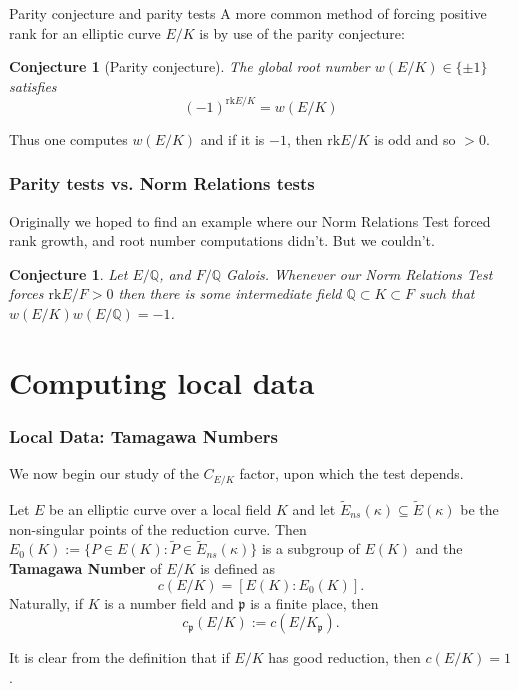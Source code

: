 \documentclass{beamer}
\newcommand{\rk}{\mathrm{rk}}
\newcommand{\pp}{\mathfrak{p}}
\newcommand{\bQ}{\mathbb{Q}}
\theoremstyle{plain}
\newtheorem{conjecture}[thm]{Conjecture}
\begin{document}
\begin{frame}{Parity conjecture and parity tests}
    A more common method of forcing positive rank for an elliptic curve $E / K$ is by use of the parity conjecture:
    \begin{conjecture}[Parity conjecture]\label{parity}
            The \textit{global root number} $w(E / K) \in \{ \pm 1 \}$ satisfies 
            $$(-1)^{\rk E / K} = w(E / K)$$
    \end{conjecture} \pause
    
    Thus one computes $w(E / K)$ and if it is $-1$, then $\rk E / K$ is odd and so $> 0$. 

\end{frame}

\begin{frame}
    \frametitle{Parity tests vs. Norm Relations tests}

    Originally we hoped to find an example where our Norm Relations Test forced rank growth, and root number computations didn't. \pause But we couldn't. \pause \text{:(} \pause

    \begin{conjecture}
        Let $E / \bQ$, and $F / \bQ$ Galois. Whenever our Norm Relations Test forces $\rk E / F >0$ then there is some intermediate field $\bQ \subset K \subset F$ such that $w(E / K)w(E / \bQ) = -1$.
    \end{conjecture}
\end{frame}

\section*{Computing local data}
\frame{\sectionpage}

\begin{frame}
    \frametitle{Local Data: Tamagawa Numbers}
    We now begin our study of the $C_{E/K}$ factor, upon which the test depends. \pause

    \begin{definition}
        Let $E$ be an elliptic curve over a local field $K$ and let $\tilde{E}_{ns}(\kappa)\subseteq \tilde{E}(\kappa)$ be the non-singular points of the reduction curve. Then $E_0(K):=\{P\in E(K):\tilde{P}\in \tilde{E}_{ns}(\kappa)\}$ is a subgroup of $E(K)$ and the \textbf{Tamagawa Number} of $E/K$ is defined as $$c(E/K)=[E(K):E_{0}(K)].$$
        \pause Naturally, if $K$ is a number field and $\pp$ is a finite place, then
        $$c_\pp(E/K):=c(E/K_\pp).$$
    \end{definition} \pause
    It is clear from the definition that if $E/K$ has good reduction, then $c(E/K)=1$.
\end{frame}
\end{document}

